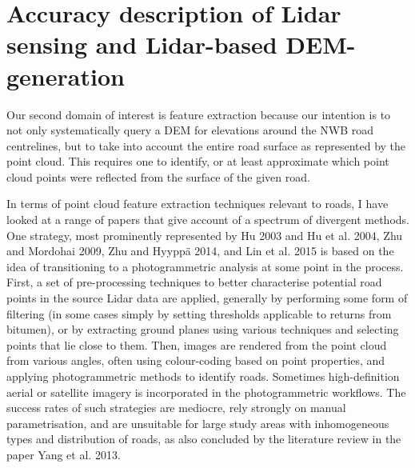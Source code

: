 \section*{Accuracy description of Lidar sensing and Lidar-based DEM-generation}

Our second domain of interest is feature extraction because our intention is to not only systematically query a DEM for elevations around the NWB road centrelines, but to take into account the entire road surface as represented by the point cloud. This requires one to identify, or at least approximate which point cloud points were reflected from the surface of the given road.

In terms of point cloud feature extraction techniques relevant to roads, I have looked at a range of papers that give account of a spectrum of divergent methods. One strategy, most prominently represented by Hu 2003 and Hu et al. 2004, Zhu and Mordohai 2009, Zhu and Hyyppä 2014, and Lin et al. 2015 is based on the idea of transitioning to a photogrammetric analysis at some point in the process. First, a set of pre-processing techniques to better characterise potential road points in the source Lidar data are applied, generally by performing some form of filtering (in some cases simply by setting thresholds applicable to returns from bitumen), or by extracting ground planes using various techniques and selecting points that lie close to them. Then, images are rendered from the point cloud from various angles, often using colour-coding based on point properties, and applying photogrammetric methods to identify roads. Sometimes high-definition aerial or satellite imagery is incorporated in the photogrammetric workflows. The success rates of such strategies are mediocre, rely strongly on manual parametrisation, and are unsuitable for large study areas with inhomogeneous types and distribution of roads, as also concluded by the literature review in the paper Yang et al. 2013.

